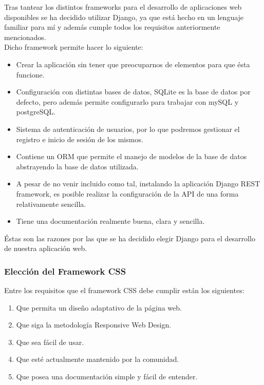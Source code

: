     Tras tantear los distintos frameworks para el desarrollo de aplicaciones web disponibles
    se ha decidido utilizar Django, ya que está hecho en un lenguaje familiar para mí y
    además cumple todos los requisitos anteriormente mencionados.\\

    Dicho framework permite hacer lo siguiente:
        
        \begin{itemize}
            \item Crear la aplicación sin tener que preocuparnos de elementos para que
            ésta funcione.
            \item Configuración con distintas bases de datos, SQLite es la base de datos
            por defecto, pero además permite configurarlo para trabajar con mySQL y
            postgreSQL.
            \item Sistema de autenticación de usuarios, por lo que podremos gestionar el
            registro e inicio de sesión de los mismos.
            \item Contiene un ORM que permite el manejo de modelos de la base de datos
            abstrayendo la base de datos utilizada.
            \item A pesar de no venir incluido como tal, instalando la aplicación Django
            REST framework, es posible realizar la configuración de la API de una forma
            relativamente sencilla.
            \item Tiene una documentación realmente buena, clara y sencilla.
        \end{itemize}
    
    Éstas son las razones por las que se ha decidido elegir Django para el desarrollo de
    nuestra aplicación web.

    \subsubsection{Elección del Framework CSS}
    Entre los requisitos que el framework CSS debe cumplir están los siguientes:

        \begin{enumerate}
            \item Que permita un diseño adaptativo de la página web.
            \item Que siga la metodología Responsive Web Design.
            \item Que sea fácil de usar.
            \item Que esté actualmente mantenido por la comunidad.
            \item Que posea una documentación simple y fácil de entender. 
        \end{enumerate}

